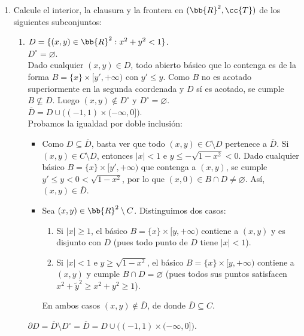 \documentclass[12pt]{article}
\begin{document}
\begin{ejercicio}
\begin{enumerate}[label=\alph*)]
    \item Calcule el interior, la clausura y la frontera en $(\bb{R}^2, \cc{T})$ de los siguientes subconjuntos:
    \begin{enumerate}
        \item $D = \{ (x, y) \in \bb{R}^2 : x^2 + y^2 < 1 \}$.\\
        $D^{\circ} = \varnothing$.\\
        Dado cualquier $(x, y) \in D$, todo abierto básico que lo contenga es de la forma $B = \{x\} \times [y', +\infty)$ con $y' \leq y$. Como $B$ no es acotado superiormente en la segunda coordenada y $D$ sí es acotado, se cumple $B \not\subseteq D$. Luego $(x, y) \notin D^{\circ}$ y $D^{\circ} = \varnothing$.\\

        $\overline{D} = D \cup \big((-1, 1) \times (-\infty, 0]\big)$.\\
        Probamos la igualdad por doble inclusión:
        \begin{itemize}
            \item[($\supseteq$)] Como $D \subseteq \overline{D}$, basta ver que todo $(x, y) \in C \setminus D$ pertenece a $\overline{D}$. Si $(x, y) \in C \setminus D$, entonces $|x| < 1$ e $y \leq -\sqrt{1 - x^2} < 0$. Dado cualquier básico $B = \{x\} \times [y', +\infty)$ que contenga a $(x, y)$, se cumple $y' \leq y < 0 < \sqrt{1 - x^2}$, por lo que $(x, 0) \in B \cap D \neq \varnothing$. Así, $(x, y) \in \overline{D}$.
            \item[($\subseteq$)] Sea $(x, y) \in \bb{R}^2 \setminus C$. Distinguimos dos casos:
            \begin{enumerate}
                \item Si $|x| \geq 1$, el básico $B = \{x\} \times [y, +\infty)$ contiene a $(x, y)$ y es disjunto con $D$ (pues todo punto de $D$ tiene $|x| < 1$).
                \item Si $|x| < 1$ e $y \geq \sqrt{1 - x^2}$, el básico $B = \{x\} \times [y, +\infty)$ contiene a $(x, y)$ y cumple $B \cap D = \varnothing$ (pues todos sus puntos satisfacen $x^2 + \tilde{y}^2 \geq x^2 + y^2 \geq 1$).
            \end{enumerate}
            En ambos casos $(x, y) \notin \overline{D}$, de donde $\overline{D} \subseteq C$.
        \end{itemize}
        $\partial D = \overline{D} \setminus D^{\circ} = \overline{D} = D \cup \big((-1, 1) \times (-\infty, 0]\big)$.
        \begin{center}

\end{center}
\end{enumerate}
\end{enumerate}
\end{ejercicio}
\end{document}

